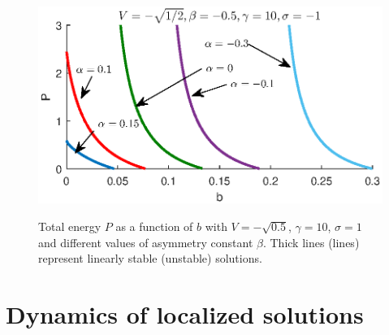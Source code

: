 \documentclass[aps,pre,showpacs,twocolumn]{revtex4}
\begin{document}
\begin{figure}[!htb]
\begin{center}
\scalebox{.7} {\includegraphics{branches_V-05_sat10_ds-05_sigma-1_final.eps}}
\end{center}
\caption{Total energy $P$ as a function of $b$ with $V=-\sqrt{0.5}$, $\gamma=10$, $\sigma=1$ and different values of asymmetry  constant $\beta$. Thick lines (lines) represent linearly stable (unstable) solutions.}
\label{fig:branches_V-05_sat10_ds-05_sigma-1}
\end{figure}




\section{Dynamics of localized solutions}
\end{document}
